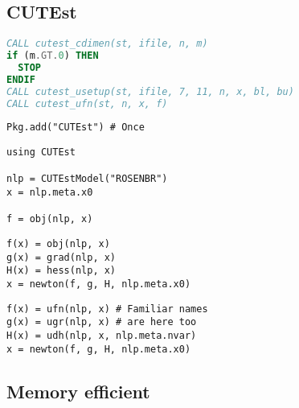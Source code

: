 \subsection{CUTEst}

\begin{frame}[t,fragile]
\begin{lstlisting}[language=Fortran]
CALL cutest_cdimen(st, ifile, n, m)
if (m.GT.0) THEN
  STOP
ENDIF
CALL cutest_usetup(st, ifile, 7, 11, n, x, bl, bu)
CALL cutest_ufn(st, n, x, f)
\end{lstlisting}
\end{frame}

\begin{frame}[t,fragile]
\begin{lstlisting}
Pkg.add("CUTEst") # Once
\end{lstlisting}
\begin{lstlisting}
using CUTEst

nlp = CUTEstModel("ROSENBR")
x = nlp.meta.x0

f = obj(nlp, x)
\end{lstlisting}
\end{frame}

\begin{frame}[t,fragile]

\begin{lstlisting}
f(x) = obj(nlp, x)
g(x) = grad(nlp, x)
H(x) = hess(nlp, x)
x = newton(f, g, H, nlp.meta.x0)
\end{lstlisting}
\end{frame}

\begin{frame}[t,fragile]

\begin{lstlisting}
f(x) = ufn(nlp, x) # Familiar names
g(x) = ugr(nlp, x) # are here too
H(x) = udh(nlp, x, nlp.meta.nvar)
x = newton(f, g, H, nlp.meta.x0)
\end{lstlisting}
\end{frame}

\subsection{Memory efficient}

\begin{frame}[t,fragile]

\end{frame}

